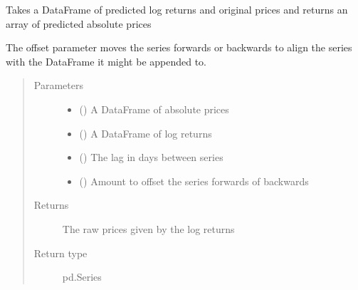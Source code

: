 \documentclass[letterpaper,10pt,english]{sphinxmanual}
\begin{document}

\begin{fulllineitems}
\label{\detokenize{index:Forecaster.eval_inspect.inverse_log_returns}}
Takes a DataFrame of predicted log returns and original
prices and returns an array of predicted absolute prices

The offset parameter moves the series forwards or backwards to
align the series with the DataFrame it might be appended to.
\begin{quote}\begin{description}
\item[{Parameters}] \leavevmode\begin{itemize}
\item {} 
 () \textendash{} A DataFrame of absolute prices

\item {} 
 () \textendash{} A DataFrame of log returns

\item {} 
 () \textendash{} The lag in days between series

\item {} 
 () \textendash{} Amount to offset the series forwards of backwards

\end{itemize}

\item[{Returns}] \leavevmode
The raw prices given by the log returns

\item[{Return type}] \leavevmode
pd.Series

\end{description}\end{quote}

\end{fulllineitems}
\end{document}
